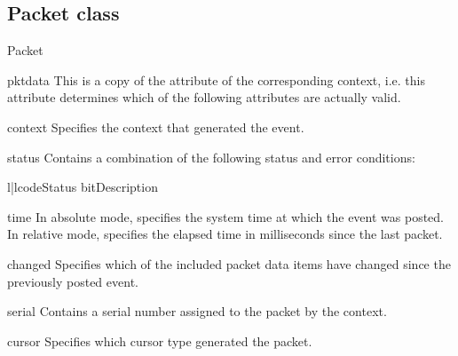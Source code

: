 \subsection{Packet class}

\begin{classdesc}{Packet}{}
\end{classdesc}

\begin{memberdesc}{pktdata}
This is a copy of the  attribute of the corresponding
context, i.e. this attribute determines which of the following attributes
are actually valid.
\end{memberdesc}

\begin{memberdesc}{context}
Specifies the context that generated the event.
\end{memberdesc}

\begin{memberdesc}{status}
Contains a combination of the following status and error conditions:

\begin{tableii}{l|l}{code}{Status bit}{Description}
\end{tableii}
\end{memberdesc}

\begin{memberdesc}{time}
In absolute mode, specifies the system time at which the event was posted.
In relative mode, specifies the elapsed time in milliseconds since the last
packet.
\end{memberdesc}

\begin{memberdesc}{changed}
Specifies which of the included packet data items have changed since the
previously posted event.
\end{memberdesc}

\begin{memberdesc}{serial}
Contains a serial number assigned to the packet by the context.
\end{memberdesc}

\begin{memberdesc}{cursor}
Specifies which cursor type generated the packet.
\end{memberdesc}

